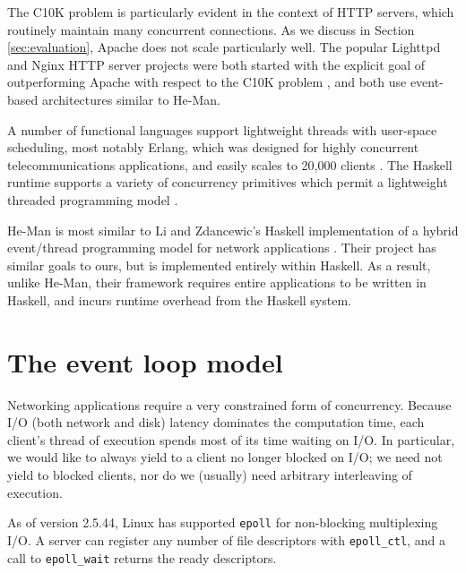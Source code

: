 \documentclass[preprint,10pt]{sigplanconf}
\renewcommand{\t}{\texttt}
\begin{document}
The C10K problem is particularly evident in the context of HTTP servers, which
routinely maintain many concurrent connections. As we discuss in Section
\ref{sec:evaluation}, Apache does not scale particularly well. The popular
Lighttpd and Nginx HTTP server projects were both started with the explicit goal
of outperforming Apache with respect to the C10K problem \cite{Lighttpd,Nginx},
and both use event-based architectures similar to He-Man. 

A number of functional languages support lightweight threads with user-space
scheduling, most notably Erlang, which was designed for highly concurrent
telecommunications applications, and easily scales to 20,000 clients
\cite{Hellstrom}. The Haskell runtime supports a variety of concurrency
primitives which permit a lightweight threaded programming model \cite{LiEtAl}.


He-Man is most similar to Li and Zdancewic's Haskell implementation of a hybrid
event/thread programming model for network applications \cite{LiZdancewic}.
Their project has similar goals to ours, but is implemented entirely within
Haskell. As a result, unlike He-Man, their framework requires entire
applications to be written in Haskell, and incurs runtime overhead from the
Haskell system.

\section{The event loop model}

Networking applications require a very constrained form of
concurrency. Because I/O (both network and disk) latency dominates the
computation time, each client's thread of execution spends most of its
time waiting on I/O. In particular, we would like to always yield to a
client no longer blocked on I/O; we need not yield to blocked clients,
nor do we (usually) need arbitrary interleaving of execution.

As of version 2.5.44, Linux has supported \t{epoll} for non-blocking
multiplexing I/O. A server can register any number of file descriptors with
\t{epoll\_ctl}, and a call to \t{epoll\_wait} returns the ready descriptors. 
\end{document}
